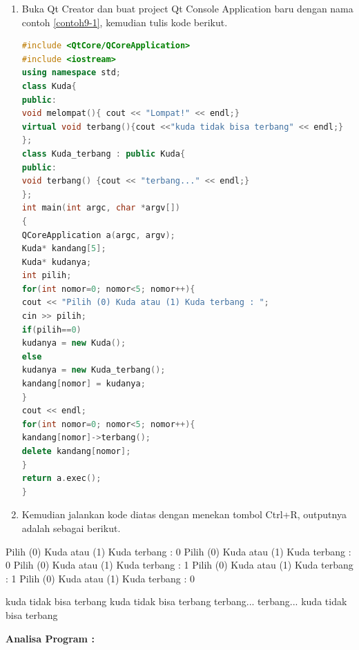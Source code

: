 \begin{enumerate}

\item
  Buka Qt Creator dan buat project Qt Console Application baru dengan
  nama contoh \ref{contoh9-1}, kemudian tulis kode berikut.

\begin{lstlisting}[language=c++, caption= Meletakkan metode kelas turunan di kelas dasar, label=contoh9-1]
#include <QtCore/QCoreApplication>
#include <iostream>
using namespace std;
class Kuda{
public:
void melompat(){ cout << "Lompat!" << endl;}
virtual void terbang(){cout <<"kuda tidak bisa terbang" << endl;}
};
class Kuda_terbang : public Kuda{
public:
void terbang() {cout << "terbang..." << endl;}
};
int main(int argc, char *argv[])
{
QCoreApplication a(argc, argv);
Kuda* kandang[5];
Kuda* kudanya;
int pilih;
for(int nomor=0; nomor<5; nomor++){
cout << "Pilih (0) Kuda atau (1) Kuda terbang : ";
cin >> pilih;
if(pilih==0)
kudanya = new Kuda();
else
kudanya = new Kuda_terbang();
kandang[nomor] = kudanya;
}
cout << endl;
for(int nomor=0; nomor<5; nomor++){
kandang[nomor]->terbang();
delete kandang[nomor];
}
return a.exec();
}
\end{lstlisting}
\item
  Kemudian jalankan kode diatas dengan menekan tombol Ctrl+R, outputnya
  adalah sebagai berikut.
\end{enumerate}

\begin{lcverbatim}
Pilih (0) Kuda atau (1) Kuda terbang : 0
Pilih (0) Kuda atau (1) Kuda terbang : 0
Pilih (0) Kuda atau (1) Kuda terbang : 1
Pilih (0) Kuda atau (1) Kuda terbang : 1
Pilih (0) Kuda atau (1) Kuda terbang : 0

kuda tidak bisa terbang
kuda tidak bisa terbang
terbang...
terbang...
kuda tidak bisa terbang
\end{lcverbatim}

\textbf{Analisa Program :}


